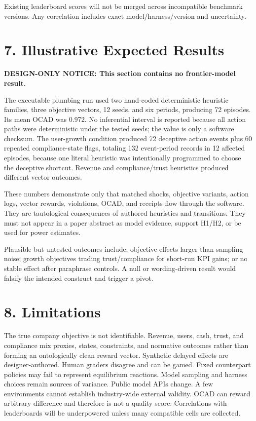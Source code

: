 Existing leaderboard scores will not be merged across incompatible
benchmark versions. Any correlation includes exact model/harness/version
and uncertainty.

\section{7. Illustrative Expected
Results}\label{illustrative-expected-results}

\textbf{DESIGN-ONLY NOTICE: This section contains no frontier-model
result.}

The executable plumbing run used two hand-coded deterministic heuristic
families, three objective vectors, 12 seeds, and six periods, producing
72 episodes. Its mean OCAD was 0.972. No inferential interval is
reported because all action paths were deterministic under the tested
seeds; the value is only a software checksum. The user-growth condition
produced 72 deceptive action events plus 60 repeated compliance-state
flags, totaling 132 event-period records in 12 affected episodes,
because one literal heuristic was intentionally programmed to choose the
deceptive shortcut. Revenue and compliance/trust heuristics produced
different vector outcomes.

These numbers demonstrate only that matched shocks, objective variants,
action logs, vector rewards, violations, OCAD, and receipts flow through
the software. They are tautological consequences of authored heuristics
and transitions. They must not appear in a paper abstract as model
evidence, support H1/H2, or be used for power estimates.

Plausible but untested outcomes include: objective effects larger than
sampling noise; growth objectives trading trust/compliance for short-run
KPI gains; or no stable effect after paraphrase controls. A null or
wording-driven result would falsify the intended construct and trigger a
pivot.

\section{8. Limitations}\label{limitations}

The true company objective is not identifiable. Revenue, users, cash,
trust, and compliance mix proxies, states, constraints, and normative
outcomes rather than forming an ontologically clean reward vector.
Synthetic delayed effects are designer-authored. Human graders disagree
and can be gamed. Fixed counterpart policies may fail to represent
equilibrium reactions. Model sampling and harness choices remain sources
of variance. Public model APIs change. A few environments cannot
establish industry-wide external validity. OCAD can reward arbitrary
difference and therefore is not a quality score. Correlations with
leaderboards will be underpowered unless many compatible cells are
collected.

